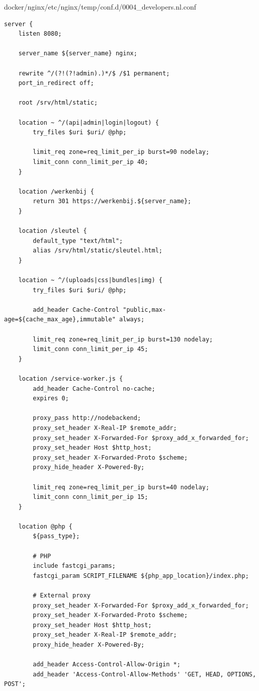 docker/nginx/etc/nginx/temp/conf.d/0004\_developers.nl.conf
\begin{verbatim}
server {
    listen 8080;

    server_name ${server_name} nginx;

    rewrite ^/(?!(?!admin).)*/$ /$1 permanent;
    port_in_redirect off;

    root /srv/html/static;

    location ~ ^/(api|admin|login|logout) {
        try_files $uri $uri/ @php;

        limit_req zone=req_limit_per_ip burst=90 nodelay;
        limit_conn conn_limit_per_ip 40;
    }
    
    location /werkenbij {
        return 301 https://werkenbij.${server_name};
    }
    
    location /sleutel {
    	default_type "text/html";
    	alias /srv/html/static/sleutel.html;
	}

    location ~ ^/(uploads|css|bundles|img) {
        try_files $uri $uri/ @php;

        add_header Cache-Control "public,max-age=${cache_max_age},immutable" always;

        limit_req zone=req_limit_per_ip burst=130 nodelay;
        limit_conn conn_limit_per_ip 45;
    }

    location /service-worker.js {
        add_header Cache-Control no-cache;
        expires 0;

        proxy_pass http://nodebackend;
        proxy_set_header X-Real-IP $remote_addr;
        proxy_set_header X-Forwarded-For $proxy_add_x_forwarded_for;
        proxy_set_header Host $http_host;
        proxy_set_header X-Forwarded-Proto $scheme;
        proxy_hide_header X-Powered-By;

        limit_req zone=req_limit_per_ip burst=40 nodelay;
        limit_conn conn_limit_per_ip 15;
    }

    location @php {
        ${pass_type};

        # PHP
        include fastcgi_params;
        fastcgi_param SCRIPT_FILENAME ${php_app_location}/index.php;

        # External proxy
        proxy_set_header X-Forwarded-For $proxy_add_x_forwarded_for;
        proxy_set_header X-Forwarded-Proto $scheme;
        proxy_set_header Host $http_host;
        proxy_set_header X-Real-IP $remote_addr;
        proxy_hide_header X-Powered-By;

        add_header Access-Control-Allow-Origin *;
        add_header 'Access-Control-Allow-Methods' 'GET, HEAD, OPTIONS, POST';


\end{verbatim}
